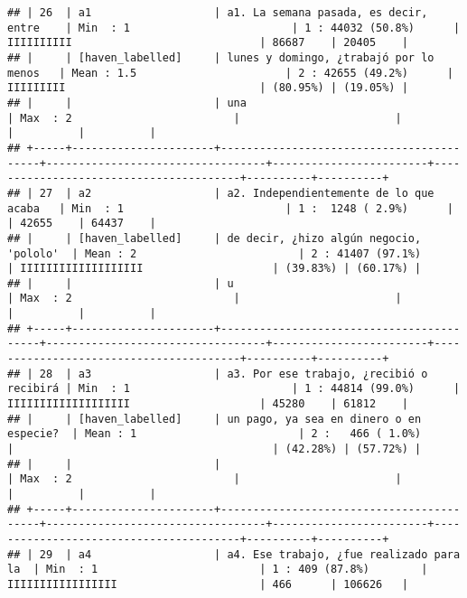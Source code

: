 \documentclass[]{article}
\begin{document}
\begin{verbatim}
## | 26  | a1                   | a1. La semana pasada, es decir, entre    | Min  : 1                         | 1 : 44032 (50.8%)      | IIIIIIIIII                             | 86687    | 20405    |
## |     | [haven_labelled]     | lunes y domingo, ¿trabajó por lo menos   | Mean : 1.5                       | 2 : 42655 (49.2%)      | IIIIIIIII                              | (80.95%) | (19.05%) |
## |     |                      | una                                      | Max  : 2                         |                        |                                        |          |          |
## +-----+----------------------+------------------------------------------+----------------------------------+------------------------+----------------------------------------+----------+----------+
## | 27  | a2                   | a2. Independientemente de lo que acaba   | Min  : 1                         | 1 :  1248 ( 2.9%)      |                                        | 42655    | 64437    |
## |     | [haven_labelled]     | de decir, ¿hizo algún negocio, 'pololo'  | Mean : 2                         | 2 : 41407 (97.1%)      | IIIIIIIIIIIIIIIIIII                    | (39.83%) | (60.17%) |
## |     |                      | u                                        | Max  : 2                         |                        |                                        |          |          |
## +-----+----------------------+------------------------------------------+----------------------------------+------------------------+----------------------------------------+----------+----------+
## | 28  | a3                   | a3. Por ese trabajo, ¿recibió o recibirá | Min  : 1                         | 1 : 44814 (99.0%)      | IIIIIIIIIIIIIIIIIII                    | 45280    | 61812    |
## |     | [haven_labelled]     | un pago, ya sea en dinero o en especie?  | Mean : 1                         | 2 :   466 ( 1.0%)      |                                        | (42.28%) | (57.72%) |
## |     |                      |                                          | Max  : 2                         |                        |                                        |          |          |
## +-----+----------------------+------------------------------------------+----------------------------------+------------------------+----------------------------------------+----------+----------+
## | 29  | a4                   | a4. Ese trabajo, ¿fue realizado para la  | Min  : 1                         | 1 : 409 (87.8%)        | IIIIIIIIIIIIIIIII                      | 466      | 106626   |

\end{verbatim}
\end{document}
